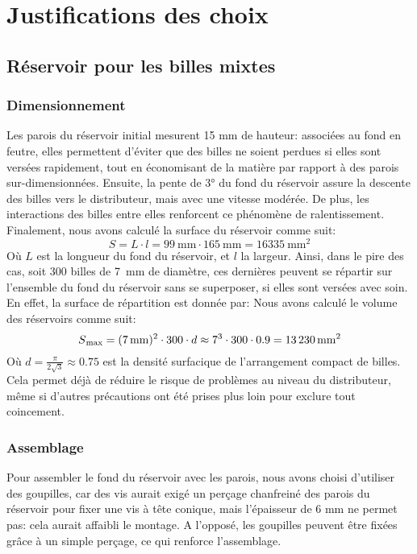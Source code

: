 \chapter{Justifications des choix}

\section{Réservoir pour les billes mixtes}

\subsection{Dimensionnement}
Les parois du réservoir initial mesurent 15 mm de hauteur: associées au fond en feutre, elles permettent d'éviter que des billes ne soient perdues si elles sont versées rapidement, tout en économisant de la matière par rapport à des parois sur-dimensionnées. 
Ensuite, la pente de \ang{3} du fond du réservoir assure la descente des billes vers le distributeur, mais avec une vitesse modérée. De plus, les interactions des billes entre elles renforcent ce phénomène de ralentissement.
Finalement, nous avons calculé la surface du réservoir comme suit:
\[S = L \cdot l = \SI{99}{\milli\metre} \cdot \SI{165}{\milli\metre} = \SI{16335}{\milli\metre\squared}\]
Où $L$ est la longueur du fond du réservoir, et $l$ la largeur.
Ainsi, dans le pire des cas, soit \num{300} billes de \SI{7}{\milli\metre} de diamètre, ces dernières peuvent se répartir sur l'ensemble du fond du réservoir sans se superposer, si elles sont versées avec soin. En effet, la surface de répartition est donnée par:
 Nous avons calculé le volume des réservoirs comme suit:
\[S\textsubscript{max} = (\SI{7}{\milli\metre})^{2} \cdot \num{300} \cdot d \approx {\num{7}}^{3} \cdot 300 \cdot 0.9 = \SI{13230}{\milli\metre\squared}\]
Où \(d = \frac{ \pi }{2\sqrt{3}} \approx \num{0.75}\) est la densité surfacique de l'arrangement compact de billes.
Cela permet déjà de réduire le risque de problèmes au niveau du distributeur, même si d'autres précautions ont été prises plus loin pour exclure tout coincement.

\subsection{Assemblage}
Pour assembler le fond du réservoir avec les parois, nous avons choisi d'utiliser des goupilles, car des vis aurait exigé un perçage chanfreiné des parois du réservoir pour fixer une vis à tête conique, mais l'épaisseur de 6 mm ne permet pas: cela aurait affaibli le montage. A l'opposé, les goupilles peuvent être fixées grâce à un simple perçage, ce qui renforce l'assemblage.

